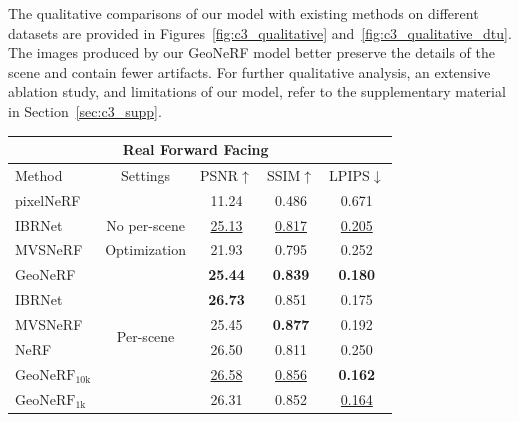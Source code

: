 The qualitative comparisons of our model with existing methods on different datasets are provided in Figures~\ref{fig:c3_qualitative} and~\ref{fig:c3_qualitative_dtu}. The images produced by our GeoNeRF model better preserve the details of the scene and contain fewer artifacts. For further qualitative analysis, an extensive ablation study, and limitations of our model, refer to the supplementary material in Section~\ref{sec:c3_supp}.

\FloatBarrier

\begin{table}[!t]
    \begin{center}
        \begin{threeparttable}
            \begin{tabular}{l|c|ccc}
            \hline
            \multicolumn{5}{c}{Real Forward Facing~\citep{mildenhall2019llff}} \\
            \hline
            Method & Settings & PSNR$\uparrow$ & SSIM$\uparrow$ & LPIPS$\downarrow$ \\
            \hline
            pixelNeRF~\citep{yu2021pixelnerf} &  & 11.24 & 0.486 & 0.671 \\
            IBRNet~\citep{wang2021ibrnet} & No per-scene & \underline{25.13} & \underline{0.817} & \underline{0.205} \\
            MVSNeRF~\citep{chen2021mvsnerf} & Optimization & 21.93 & 0.795 & 0.252 \\
            GeoNeRF &  & \textbf{25.44} & \textbf{0.839} & \textbf{0.180} \\
            \hline
            IBRNet~\citep{wang2021ibrnet} &  & \textbf{26.73} & 0.851 & 0.175 \\
            MVSNeRF~\citep{chen2021mvsnerf} & \multirow{2}{*}{Per-scene} & 25.45 & \textbf{0.877} & 0.192 \\
            NeRF~\citep{mildenhall2020nerf} & \multirow{2}{*}{Optimization} & 26.50 & 0.811 & 0.250 \\
            $\text{GeoNeRF}_{\text{10k}}$ &  & \underline{26.58} & \underline{0.856} & \textbf{0.162} \\
            $\text{GeoNeRF}_{\text{1k}}$ &  & 26.31 & 0.852 & \underline{0.164} \\
            \hline
            \end{tabular}
        \end{threeparttable}
    \end{center}

\end{table}
